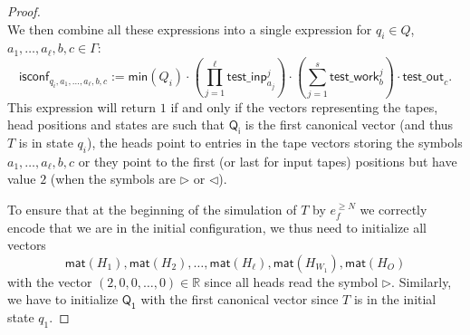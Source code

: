 \begin{proof}
$$    $$
    We then combine all these expressions into a single expression for $q_i\in Q$, 
    $a_1,\ldots,a_\ell,b,c\in\Gamma$:
    $$
    \mathsf{isconf}_{q_i,a_1,\ldots,a_\ell,b,c}:=
    \mathsf{min}(Q_i)\cdot \left(\prod_{j=1}^{\ell} \mathsf{test\_inp}_{a_j}^j\right)
    \cdot\left(\sum_{j=1}^s \mathsf{test\_work}_b^j\right)\cdot \mathsf{test\_out}_{c}.
    $$
    This expression will return $1$ if and only if the vectors representing the tapes, 
    head positions and states are such that $\mathsf{Q_i}$ is the first canonical vector 
    (and thus $T$ is in state $q_i$), the heads point to entries in the tape vectors storing 
    the symbols $a_1,\ldots,a_{\ell}, b,c$ or they point to the first (or last for input tapes) 
    positions but have value $2$ (when the symbols are $\rhd$ or $\lhd$). 

    To ensure that at the beginning of the simulation of $T$ by $e_f^{\geq N}$ we correctly encode 
    that we are in the initial configuration, we thus need to initialize all vectors 
    $$\mathsf{mat}(H_1),\mathsf{mat}(H_2),\ldots, \mathsf{mat}(H_\ell), \mathsf{mat}(H_{W_1}),\mathsf{mat}(H_O)$$
    with the vector $(2,0,0,\ldots,0)\in\mathbb{R}$ since all heads read the symbol $\rhd$. Similarly, 
    we have to initialize $\mathsf{Q_1}$ with the first canonical vector since $T$ is in the initial state $q_1$.


\end{proof}
